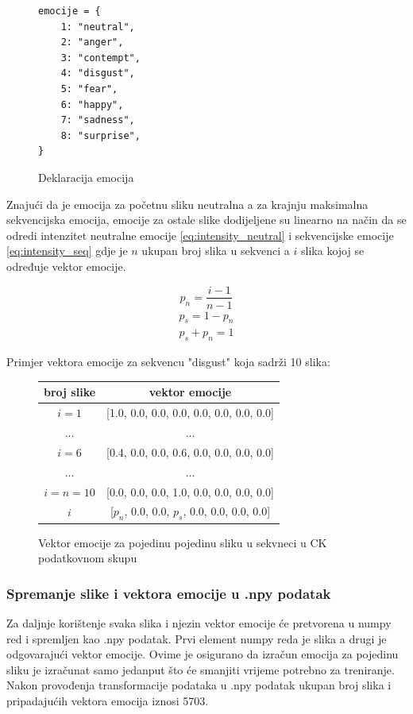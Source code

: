 \documentclass[times, utf8, zavrsni,numeric,pstricks]{fer}
\begin{document}
\begin{figure}[H]
\centering
\begin{Verbatim}[fontsize=\small]
emocije = {
    1: "neutral",
    2: "anger",
    3: "contempt",
    4: "disgust",
    5: "fear",
    6: "happy",
    7: "sadness",
    8: "surprise",
}
\end{Verbatim}
\caption{Deklaracija emocija}
\label{cb:emo_declare}
\end{figure}

\noindent
Znajući da je emocija za početnu sliku neutralna a za krajnju maksimalna sekvencijska emocija, emocije za ostale slike dodijeljene su linearno na način da se odredi intenzitet neutralne emocije \ref{eq:intensity_neutral} i sekvencijske emocije \ref{eq:intensity_seq} gdje je $n$ ukupan broj slika u sekvenci a $i$ slika kojoj se određuje vektor emocije.

\begin{equation}\label{eq:intensity_neutral}
	p_{n} = \dfrac{i-1}{n-1}	
\end{equation}
\begin{equation}\label{eq:intensity_seq}
\begin{split}
	p_{s} = 1 - p_{n}\\
	p_{s} + p_{n} = 1	
\end{split}
\end{equation}

\noindent
Primjer vektora emocije za sekvencu "disgust" koja sadrži 10 slika:

\begin{figure}[H]
\centering
\begin{tabular}{|c|c|} 
\hline
broj slike & vektor emocije \\
\hline
$i = 1$ & [1.0, 0.0, 0.0, 0.0, 0.0, 0.0, 0.0, 0.0] \\
... & ... \\
$i = 6$ & [0.4, 0.0, 0.0, 0.6, 0.0, 0.0, 0.0, 0.0] \\
... & ... \\
$i = n = 10$ & [0.0, 0.0, 0.0, 1.0, 0.0, 0.0, 0.0, 0.0] \\
$i$ & [$p_n$, 0.0, 0.0, $p_s$, 0.0, 0.0, 0.0, 0.0]  \\
\hline
\end{tabular}
\caption{Vektor emocije za pojedinu pojedinu sliku u sekvneci u CK podatkovnom skupu}
\label{pic:ck_emotion_rise}
\end{figure}



\subsubsection{Spremanje slike i vektora emocije u .npy podatak}\label{self:npy_save}
Za daljnje korištenje svaka slika i njezin vektor emocije će pretvorena u numpy red \cite{numpy_array} i spremljen kao .npy podatak. Prvi element numpy reda je slika a drugi je odgovarajući vektor emocije. Ovime je osigurano da izračun emocija za pojedinu sliku je izračunat samo jedanput što će smanjiti vrijeme potrebno za treniranje. Nakon provođenja transformacije podataka u .npy podatak ukupan broj slika i pripadajućih vektora emocija iznosi 5703. 
\end{document}
